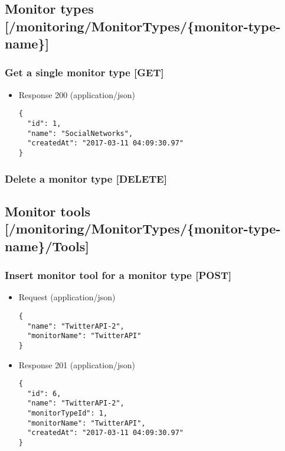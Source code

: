\subsection{Monitor types
{[}/monitoring/MonitorTypes/\{monitor-type-name\}{]}}\label{monitor-types-monitoringmonitortypesmonitor-type-name}

\subsubsection{Get a single monitor type
{[}GET{]}}\label{get-a-single-monitor-type-get}

\begin{itemize}
\item
  Response 200 (application/json)

\begin{verbatim}
{
  "id": 1,
  "name": "SocialNetworks",
  "createdAt": "2017-03-11 04:09:30.97"
}
\end{verbatim}
\end{itemize}

\subsubsection{Delete a monitor type
{[}DELETE{]}}\label{delete-a-monitor-type-delete}

\subsection{Monitor tools
{[}/monitoring/MonitorTypes/\{monitor-type-name\}/Tools{]}}\label{monitor-tools-monitoringmonitortypesmonitor-type-nametools}

\subsubsection{Insert monitor tool for a monitor type
{[}POST{]}}\label{insert-monitor-tool-for-a-monitor-type-post}

\begin{itemize}
\item
  Request (application/json)

\begin{verbatim}
{
  "name": "TwitterAPI-2",
  "monitorName": "TwitterAPI"
}
\end{verbatim}
\item
  Response 201 (application/json)

\begin{verbatim}
{
  "id": 6,
  "name": "TwitterAPI-2",
  "monitorTypeId": 1,
  "monitorName": "TwitterAPI",
  "createdAt": "2017-03-11 04:09:30.97"
}
\end{verbatim}
\end{itemize}

